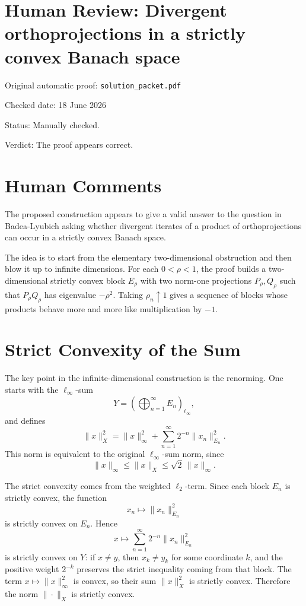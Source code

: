 \documentclass[11pt]{article}
\begin{document}
\section*{Human Review: Divergent orthoprojections in a strictly convex Banach space}

\noindent Original automatic proof: \texttt{solution\_packet.pdf}

\noindent Checked date: 18 June 2026

\noindent Status: Manually checked.

\noindent Verdict: The proof appears correct.

\section*{Human Comments}

The proposed construction appears to give a valid answer to the question in
Badea-Lyubich asking whether divergent iterates of a product of
orthoprojections can occur in a strictly convex Banach space.

The idea is to start from the elementary two-dimensional obstruction and then
blow it up to infinite dimensions.  For each \(0<\rho<1\), the proof builds
a two-dimensional strictly convex block \(E_\rho\) with two norm-one
projections \(P_\rho,Q_\rho\) such that \(P_\rho Q_\rho\) has eigenvalue
\(-\rho^2\).  Taking \(\rho_n\uparrow 1\) gives a sequence of blocks whose
products behave more and more like multiplication by \(-1\).

\section*{Strict Convexity of the Sum}

The key point in the infinite-dimensional construction is the renorming.  One
starts with the \(\ell_\infty\)-sum
\[
  Y=\left(\bigoplus_{n=1}^\infty E_n\right)_{\ell_\infty},
\]
and defines
\[
  \|x\|_X^2
  =
  \|x\|_\infty^2
  +
  \sum_{n=1}^\infty 2^{-n}\|x_n\|_{E_n}^2.
\]
This norm is equivalent to the original \(\ell_\infty\)-sum norm, since
\[
  \|x\|_\infty
  \leq
  \|x\|_X
  \leq
  \sqrt{2}\,\|x\|_\infty.
\]

The strict convexity comes from the weighted \(\ell_2\)-term.  Since each
block \(E_n\) is strictly convex, the function
\[
  x_n\mapsto \|x_n\|_{E_n}^2
\]
is strictly convex on \(E_n\).  Hence
\[
  x\mapsto
  \sum_{n=1}^\infty 2^{-n}\|x_n\|_{E_n}^2
\]
is strictly convex on \(Y\): if \(x\neq y\), then \(x_k\neq y_k\) for some
coordinate \(k\), and the positive weight \(2^{-k}\) preserves the strict
inequality coming from that block.  The term \(x\mapsto \|x\|_\infty^2\) is
convex, so their sum \(\|x\|_X^2\) is strictly convex.  Therefore the norm
\(\|\cdot\|_X\) is strictly convex.
\end{document}
